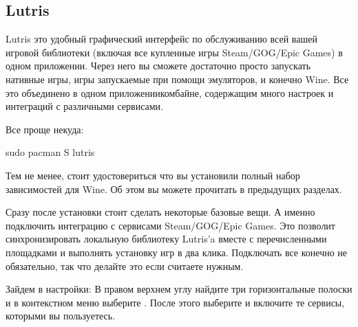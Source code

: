 \documentclass[letterpaper,10pt,russian,openany]{sphinxmanual}
\begin{document}
\ignorespaces 

\subsection{Lutris}
\label{\detokenize{source/linux-gaming:lutris}}\label{\detokenize{source/linux-gaming:lutris-and-additions}}\label{\detokenize{source/linux-gaming:index-13}}
\sphinxAtStartPar
Lutris \sphinxhyphen{} это удобный графический интерфейс по обслуживанию всей вашей игровой библиотеки
(включая все купленные игры Steam/GOG/Epic Games) в одном приложении.
Через него вы сможете достаточно просто запускать нативные игры, игры запускаемые при помощи эмуляторов, и конечно Wine.
Все это объединено в одном приложении\sphinxhyphen{}комбайне, содержащим много настроек и интеграций с различными сервисами.

\sphinxAtStartPar
{}

\sphinxAtStartPar
Все проще некуда:

\begin{sphinxVerbatim}[commandchars=\\\{\}]
sudo pacman \PYGZhy{}S lutris
\end{sphinxVerbatim}

\sphinxAtStartPar
Тем не менее, стоит удостовериться что вы установили полный набор зависимостей для Wine. Об этом вы можете прочитать в предыдущих разделах.

\noindent{}

\sphinxAtStartPar
{}

\sphinxAtStartPar
Сразу после установки стоит сделать некоторые базовые вещи. А именно подключить интеграцию с сервисами Steam/GOG/Epic Games.
Это позволит синхронизировать локальную библиотеку Lutris'a вместе с перечисленными площадками и выполнять установку игр в два клика.
Подключать все конечно не обязательно, так что делайте это если считаете нужным.

\sphinxAtStartPar
{} Зайдем в настройки: В правом верхнем углу найдите три горизонтальные полоски и в контекстном меню выберите .
После этого выберите  и включите те сервисы, которыми вы пользуетесь.

\sphinxAtStartPar
{}
\end{document}
